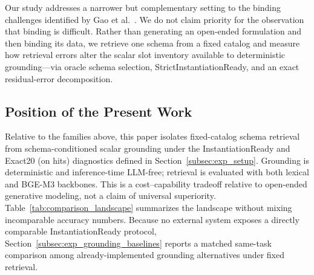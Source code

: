 \documentclass[pdflatex,sn-basic,Numbered]{sn-jnl}
\begin{document}
Our study addresses a narrower but complementary setting to the binding challenges identified by Gao et al.\ \cite{gao2026models}. We do not claim priority for the observation that binding is difficult. Rather than generating an open-ended formulation and then binding its data, we retrieve one schema from a fixed catalog and measure how retrieval errors alter the scalar slot inventory available to deterministic grounding---via oracle schema selection, StrictInstantiationReady, and an exact residual-error decomposition.

\subsection{Position of the Present Work}
\label{subsec:rw_position}

Relative to the families above, this paper isolates fixed-catalog schema retrieval from schema-conditioned scalar grounding under the InstantiationReady and Exact20 (on hits) diagnostics defined in Section~\ref{subsec:exp_setup}. Grounding is deterministic and inference-time LLM-free; retrieval is evaluated with both lexical and BGE-M3 backbones. This is a cost--capability tradeoff relative to open-ended generative modeling, not a claim of universal superiority. Table~\ref{tab:comparison_landscape} summarizes the landscape without mixing incomparable accuracy numbers. Because no external system exposes a directly comparable InstantiationReady protocol, Section~\ref{subsec:exp_grounding_baselines} reports a matched same-task comparison among already-implemented grounding alternatives under fixed retrieval.
\end{document}
